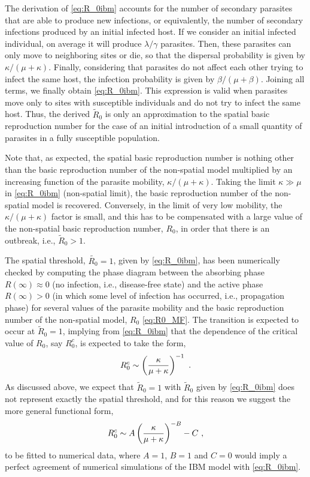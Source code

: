 The derivation of \cref{eq:R_0ibm} accounts for the number of secondary
parasites that are able to produce new infections, or equivalently, the number
of secondary infections produced by an initial infected host. If we consider an
initial infected individual, on average it will produce $\lambda/\gamma$
parasites. Then, these parasites can only move to neighboring sites or die, so
that the dispersal probability is given by $\kappa/(\mu+\kappa)$. Finally,
considering that parasites do not affect each other trying to infect the same
host, the infection probability is given by $\beta/(\mu+\beta)$. Joining all
terms, we finally obtain \cref{eq:R_0ibm}. This expression is valid when
parasites move only to sites with susceptible individuals and do not try to
infect the same host. Thus, the derived $\tilde{R}_0$ is only an approximation
to the spatial basic reproduction number for the case of an initial
introduction of a small quantity of parasites in a fully susceptible
population.

Note that, as expected, the spatial basic reproduction number is nothing
other than the basic reproduction number of the non-spatial model multiplied by
an increasing function of the parasite mobility, $\kappa/(\mu+\kappa).$ Taking
the limit $\kappa\gg\mu$ in \cref{eq:R_0ibm} (non-spatial limit), the basic
reproduction number of the non-spatial model is recovered. Conversely, in the
limit of very low mobility, the $\kappa/(\mu+\kappa)$ factor is small, and this
has to be compensated with a large value of the non-spatial basic reproduction
number, $R_0$, in order that there is an outbreak, i.e., $\tilde{R}_0>1$.

The spatial threshold, $\tilde{R_0}=1$, given by \cref{eq:R_0ibm}, has been
numerically checked by computing the phase diagram between the absorbing phase
$R(\infty)\approx 0$ (no infection, i.e., disease-free state)  and the active
phase $R(\infty)> 0$ (in which some level of infection has occurred, i.e.,
propagation phase) for several values of the parasite mobility and the basic
reproduction number of the non-spatial model, $R_0$ \cref{eq:R0_MF}. The
transition is expected to occur at $\tilde{R}_0=1$, implying from
\cref{eq:R_0ibm} that the dependence of the critical value of $R_0$, say
$R_0^c$, is expected to take the form,
\begin{equation}\label{eq: R_0_crit dependence}
    R_0^c\sim\left(\frac{\kappa}{\mu+\kappa}\right)^{-1} \ .
\end{equation}
As discussed above, we expect that $\tilde{R}_0=1$ with $\tilde{R}_0$ given
by \cref{eq:R_0ibm} does not represent exactly the spatial threshold, and for
this reason we suggest the more general functional form,
\begin{equation}\label{eq: threshold_corrections}
    R_0^c\sim A\parentesi{\frac{\kappa}{\mu+\kappa}}^{-B} - C\ ,
\end{equation}
to be fitted to numerical data, where $A=1$, $B=1$ and $C=0$ would imply
a perfect agreement of numerical simulations of the IBM model with
\cref{eq:R_0ibm}.

